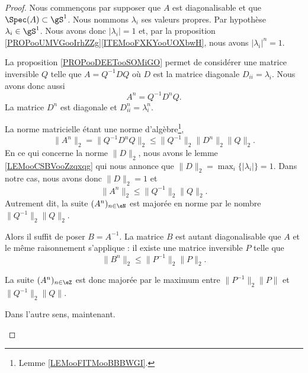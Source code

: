 \begin{proof}
    Nous commençons par supposer que \( A\) est diagonalisable et que \( \Spec(A)\subset \gS^1\). Nous nommons \( \lambda_i\) ses valeurs propres. Par hypothèse \( \lambda_i\in \gS^1\). Nous avons donc \( | \lambda_i |=1\) et, par la proposition \ref{PROPooUMVGooIrhZZg}\ref{ITEMooFXKYooUOXbwH}, nous avons \( | \lambda_i |^n=1\).

    La proposition \ref{PROPooDEETooSOMiGO} permet de considérer une matrice inversible \( Q\) telle que \( A=Q^{-1}DQ\) où \( D\) est la matrice diagonale \( D_{ii}=\lambda_i\). Nous avons donc aussi
	\begin{equation}
		A^n=Q^{-1}D^nQ.
	\end{equation}
	La matrice \( D^n\) est diagonale et \( D^n_{ii}=\lambda_i^n\). 

	\begin{subproof}
		La norme matricielle étant une norme d'algèbre\footnote{Lemme \ref{LEMooFITMooBBBWGI}.},
		\begin{equation}
			\| A^n \|_2=\| Q^{-1}D^nQ \|_2\leq \| Q^{-1} \|_2\| D^n \|_2\| Q \|_2.
		\end{equation}
		En ce qui concerne la norme \( \| D \|_2\), nous avons le lemme \ref{LEMooCSBVooZzqxqg} qui nous annonce que \( \| D \|_2=\max_i \{| \lambda_i |\}=1 \). Dans notre cas, nous avons donc \( \| D \|_2=1\) et
		\begin{equation}
			\| A^n \|_2\leq \| Q^{-1} \|_2\| Q \|_2.
		\end{equation}
		Autrement dit, la suite \( (A^n)_{n\in \eN}\) est majorée en norme par le nombre \( \| Q^{-1} \|_2\| Q \|_2\).

		Alors il suffit de poser \( B=A^{-1}\). La matrice \( B\) est autant diagonalisable que \( A\) et le même raisonnement s'applique : il existe une matrice inversible \( P\) telle que
		\begin{equation}
			\| B^n \|_2\leq \| P^{-1} \|_2\| P \|_2.
		\end{equation}

		La suite \( (A^n)_{n\in \eZ}\) est donc majorée par le maximum entre \( \| P^{-1} \|_2\| P \|\) et \( \| Q^{-1} \|_2\| Q \|\).
	\end{subproof}

	\begin{center}
		Dans l'autre sens, maintenant.
	\end{center}


\end{proof}
